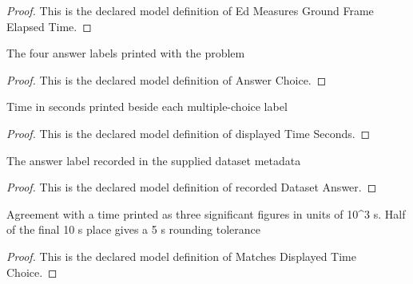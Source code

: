 \begin{proof}
  This is the declared model definition of Ed Measures Ground Frame Elapsed Time.
\end{proof}
\begin{definition}
  \label{def:physics:phyx-mini-0529:phyxminiproblems-problemphyxmini0529-answerchoice}
  The four answer labels printed with the problem
\end{definition}
\begin{proof}
  This is the declared model definition of Answer Choice.
\end{proof}
\begin{definition}
  \label{def:physics:phyx-mini-0529:phyxminiproblems-problemphyxmini0529-displayedtimeseconds}
  Time in seconds printed beside each multiple-choice label
\end{definition}
\begin{proof}
  This is the declared model definition of displayed Time Seconds.
\end{proof}
\begin{definition}
  \label{def:physics:phyx-mini-0529:phyxminiproblems-problemphyxmini0529-recordeddatasetanswer}
  The answer label recorded in the supplied dataset metadata
\end{definition}
\begin{proof}
  This is the declared model definition of recorded Dataset Answer.
\end{proof}
\begin{definition}
  \label{def:physics:phyx-mini-0529:phyxminiproblems-problemphyxmini0529-matchesdisplayedtimechoice}
  Agreement with a time printed as three significant figures in units of 10\textasciicircum{}3 s. Half of the final 10 s place gives a 5 s rounding tolerance
\end{definition}
\begin{proof}
  This is the declared model definition of Matches Displayed Time Choice.
\end{proof}
